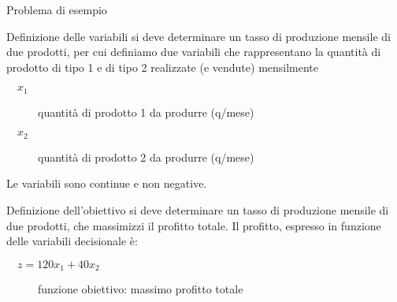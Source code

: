 \documentclass{beamer}
\begin{document}
\begin{frame}[allowframebreaks]{Problema di esempio}

\framebreak

\begin{block}{Definizione delle variabili}
si deve determinare un tasso di produzione mensile di due prodotti,
per cui definiamo due variabili che rappresentano la quantit\`a di
prodotto di tipo 1 e di tipo 2 realizzate (e vendute) mensilmente

\begin{description}
\item[$\quad x_1$]	quantit\`a di prodotto 1 da produrre (q/mese)
\item[$\quad x_2$]	quantit\`a di prodotto 2 da produrre (q/mese)
\end{description}

Le variabili sono continue e non negative.
\end{block}

\framebreak

\begin{block}{Definizione dell'obiettivo}
  si deve determinare un tasso di produzione mensile di due prodotti,
  che massimizzi il profitto totale.
  Il profitto, espresso in funzione delle variabili decisionale \`e:

\begin{description}
 \item[$\quad z = 120 x_1 + 40 x_2$]	funzione obiettivo: massimo profitto totale
\end{description}


\end{block}
\end{frame}
\end{document}
